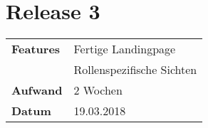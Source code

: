 
\section*{Release 3}
\label{sec:release_3}

\begin{tabular}{p{5cm} p{9cm}}
    \textbf{Features} & Fertige Landingpage \\
    & Rollenspezifische Sichten \\
    \hline
    \textbf{Aufwand} & 2 Wochen \\
    \hline
    \textbf{Datum} & 19.03.2018 \\
\end{tabular}
